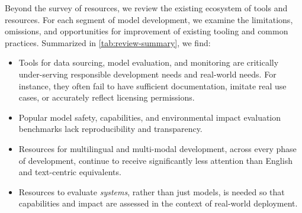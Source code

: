 Beyond the survey of resources, we review the existing ecosystem of tools and resources.
For each segment of model development, we examine the limitations, omissions, and opportunities for improvement of existing tooling and common practices.
Summarized in \cref{tab:review-summary}, we find:
\begin{itemize}[itemsep=1pt] %
    \item Tools for data sourcing, model evaluation, and monitoring are critically under-serving responsible development needs and real-world needs. For instance, they often fail to have sufficient documentation, imitate real use cases, or accurately reflect licensing permissions.
    \item Popular model safety, capabilities, and environmental impact evaluation benchmarks lack reproducibility and transparency.
    \item Resources for multilingual and multi-modal development, across every phase of development, continue to receive significantly less attention than English and text-centric equivalents.
    \item Resources to evaluate \emph{systems}, rather than just models, is needed so that capabilities and impact are assessed in the context of real-world deployment.
\end{itemize}


